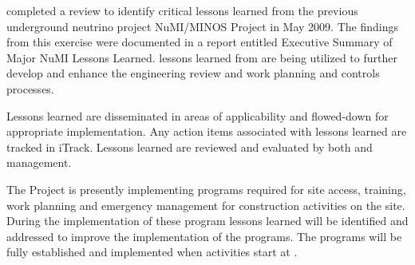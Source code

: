\fnal completed a review to
identify critical lessons learned from the previous underground
neutrino project NuMI/MINOS Project in May 2009. The findings from this
exercise were documented in a report entitled Executive Summary of
Major NuMI Lessons Learned.   lessons learned from
 are being utilized to further develop and enhance
the  engineering review and work planning and controls
processes.

Lessons learned are disseminated in areas of applicability and
flowed-down for appropriate implementation. Any action items
associated with lessons learned are tracked in iTrack. Lessons learned
are reviewed and evaluated by both \fnal and  management.

The  Project is presently implementing 
programs required for site access, training, work planning and
emergency management for construction activities on the 
site. During the implementation of these program lessons learned will
be identified and addressed to improve the implementation of the 
 programs.  The  programs will be fully
established and implemented when  activities start at
.
